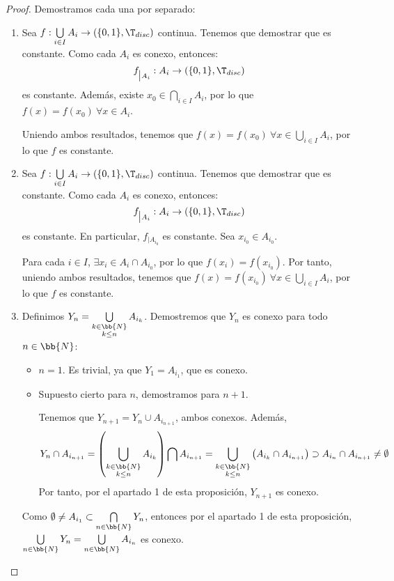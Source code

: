 \begin{proof} Demostramos cada una por separado:
    \begin{enumerate}
        \item Sea $f:\bigcup\limits_{i\in I}A_i \to (\{0,1\}, \T_{disc})$ continua. Tenemos que demostrar que es constante. Como cada $A_i$ es conexo, entonces:
        \begin{equation*}
            f_{\big |A_i}:A_i\to (\{0,1\}, \T_{disc})
        \end{equation*}
        es constante. Además, existe $x_0\in \bigcap\limits_{i\in I}A_i$, por lo que $f(x)=f(x_0)~ \forall x\in A_i$.
    
        Uniendo ambos resultados, tenemos que $f(x)=f(x_0)~\forall x\in \bigcup\limits_{i\in I}A_i$, por lo que $f$ es constante.

        \item Sea $f:\bigcup\limits_{i\in I}A_i \to (\{0,1\}, \T_{disc})$ continua. Tenemos que demostrar que es constante. Como cada $A_i$ es conexo, entonces:
        \begin{equation*}
            f_{\big |A_i}:A_i\to (\{0,1\}, \T_{disc})
        \end{equation*}
        es constante. En particular, $f_{\big |A_{i_0}}$ es constante. Sea $x_{i_0}\in A_{i_0}$.
        
        Para cada $i\in I$, $\exists x_i\in A_i\cap A_{i_0}$, por lo que $f(x_i)=f(x_{i_0})$.
        Por tanto, uniendo ambos resultados, tenemos que $f(x)=f(x_{i_0})~\forall x\in \bigcup\limits_{i\in I}A_i$, por lo que $f$ es constante.

        \item Definimos $Y_n = \bigcup\limits_{\substack{k\in \bb{N}\\k\leq n}}A_{i_k}$. Demostremos que $Y_n$ es conexo para todo $n\in \bb{N}$:        
        \begin{itemize}
            \item $n=1$. Es trivial, ya que $Y_1 = A_{i_1}$, que es conexo.
            \item Supuesto cierto para $n$, demostramos para $n+1$.
            
            Tenemos que $Y_{n+1}=Y_n\cup A_{i_{n+1}}$, ambos conexos. Además,
            \begin{equation*}
                Y_n \cap A_{i_{n+1}} = \left(\bigcup\limits_{\substack{k\in \bb{N}\\k\leq n}}A_{i_k}\right) \bigcap A_{i_{n+1}}
                = \bigcup\limits_{\substack{k\in \bb{N}\\k\leq n}}\left(A_{i_k} \cap A_{i_{n+1}}\right)
                \supset A_{i_{n}}\cap A_{i_{n+1}}\neq \emptyset
            \end{equation*}
            Por tanto, por el apartado 1 de esta proposición, $Y_{n+1}$ es conexo.
        \end{itemize}

        Como $\emptyset\neq A_{i_1}\subset \bigcap\limits_{n\in \bb{N}}Y_n$, entonces por el apartado 1 de esta proposición, $\bigcup\limits_{n\in \bb{N}}Y_n = \bigcup\limits_{n\in \bb{N}}A_{i_n}$ es conexo.
    \end{enumerate}
\end{proof}


